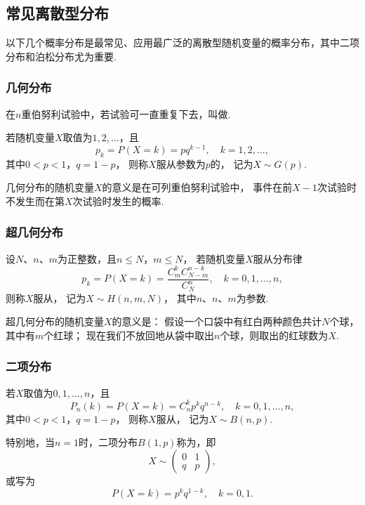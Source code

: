 \subsection{常见离散型分布}

以下几个概率分布是最常见、应用最广泛的离散型随机变量的概率分布，其中二项分布和泊松分布尤为重要.

\subsubsection{几何分布}
\begin{definition}
在\(n\)重伯努利试验中，若试验可一直重复下去，叫做.
\end{definition}

\begin{definition}
若随机变量\(X\)取值为\(1,2,\dotsc\)，且\begin{equation}
p_k = P(X=k) = p q^{k-1}, \quad k=1,2,\dotsc,
\end{equation}其中\(0 < p < 1\)，\(q = 1-p\)，
则称\(X\)服从参数为\(p\)的，
记为\(X \sim G(p)\).
\end{definition}

几何分布的随机变量\(X\)的意义是在可列重伯努利试验中，
事件在前\(X-1\)次试验时不发生而在第\(X\)次试验时发生的概率.

\subsubsection{超几何分布}
\begin{definition}
设\(N\)、\(n\)、\(m\)为正整数，且\(n \leq N\)，\(m \leq N\)，
若随机变量\(X\)服从分布律\begin{equation}
	p_k = P(X=k) = \frac{C_m^k C_{N-m}^{n-k}}{C_N^n}, \quad k=0,1,\dotsc,n,
\end{equation}
则称\(X\)服从，
记为\(X \sim H(n,m,N)\)，
其中\(n\)、\(n\)、\(m\)为参数.
\end{definition}

超几何分布的随机变量\(X\)的意义是：
假设一个口袋中有红白两种颜色共计\(N\)个球，其中有\(m\)个红球；
现在我们不放回地从袋中取出\(n\)个球，则取出的红球数为\(X\).

\subsubsection{二项分布}
\begin{definition}
若\(X\)取值为\(0,1,\dotsc,n\)，且\begin{equation}
P_n(k) = P(X=k) = C_n^k p^k q^{n-k}, \quad k=0,1,\dotsc,n,
\end{equation}其中\(0 < p < 1\)，\(q = 1-p\)，
则称\(X\)服从，
记为\(X \sim B(n,p)\).

特别地，当\(n = 1\)时，二项分布\(B(1,p)\)称为，即\[
X \sim \begin{pmatrix} 0 & 1 \\ q & p \end{pmatrix},
\]或写为\[
P(X=k) = p^k q^{1-k}, \quad k=0,1.
\]
\end{definition}

